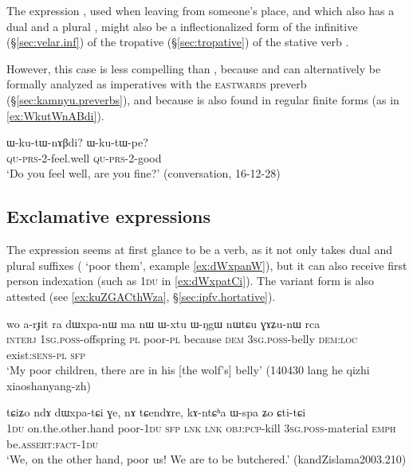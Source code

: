 The expression , used when leaving from someone's place, and which also has a dual  and a plural , might also be a inflectionalized form of the  infinitive (§\ref{sec:velar.inf}) of the  tropative   (§\ref{sec:tropative}) of the stative verb .

However, this case is less compelling than , because  and  can alternatively be formally analyzed as imperatives with the \textsc{eastwards}  preverb (§\ref{sec:kamnyu.preverbs}), and because  is also found in regular finite forms (as in \ref{ex:WkutWnABdi}).

\begin{exe}
\ex \label{ex:WkutWnABdi}
\gll  ɯ-ku-tɯ-nɤβdi? ɯ-ku-tɯ-pe? \\
 \textsc{qu}-\textsc{prs}-2-feel.well  \textsc{qu}-\textsc{prs}-2-good \\
\glt `Do you feel well, are you fine?' (conversation, 16-12-28)
\end{exe}

\subsection{Exclamative expressions} \label{sec:exclamative.inflectionalization}
The expression  seems at first glance to be a verb, as it not only takes dual and plural suffixes ( `poor them', example \ref{ex:dWxpanW}), but it can also receive first person indexation (such as \textsc{1du} in \ref{ex:dWxpatCi}). The variant form  is also attested (see \ref{ex:kuZGACthWza}, §\ref{sec:ipfv.hortative}).

\begin{exe}
\ex \label{ex:dWxpanW}
\gll wo a-rɟit ra dɯxpa-nɯ ma nɯ ɯ-xtu ɯ-ŋgɯ nɯtɕu ɣɤʑu-nɯ rca  \\
\textsc{interj} \textsc{1sg}.\textsc{poss}-offspring \textsc{pl} poor-\textsc{pl} because \textsc{dem} \textsc{3sg}.\textsc{poss}-belly  \textsc{dem}:\textsc{loc}  exist:\textsc{sens}-\textsc{pl} \textsc{sfp} \\
\glt `My poor children, there are in his [the wolf's] belly' (140430 lang he qizhi xiaoshanyang-zh)
\end{exe}

\begin{exe}
\ex \label{ex:dWxpatCi}
\gll tɕiʑo ndɤ dɯxpa-tɕi ɣe, nɤ tɕendɤre, kɤ-ntɕʰa ɯ-spa ʑo ɕti-tɕi \\
\textsc{1du} on.the.other.hand poor-\textsc{1du} \textsc{sfp} \textsc{lnk} \textsc{lnk} \textsc{obj}:\textsc{pcp}-kill \textsc{3sg}.\textsc{poss}-material \textsc{emph} be.\textsc{assert}:\textsc{fact}-\textsc{1du} \\
\glt `We, on the other hand, poor us! We are to be butchered.' (kandZislama2003.210)
\end{exe}

